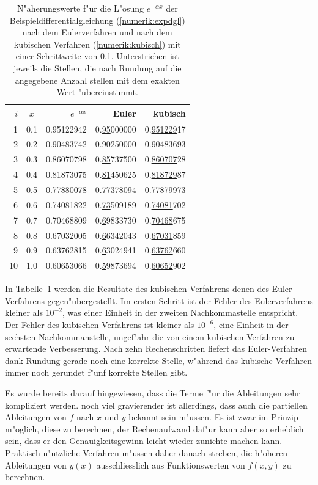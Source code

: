\begin{table}
\centering
\begin{tabular}{|r|c|r|r|r|}
\hline
$i$&$x$&$e^{-\alpha x}$&Euler&kubisch\\
\hline
 1 & 0.1 & 0.95122942 & 0.\underline{95}000000 & 0.\underline{951229}17 \\
 2 & 0.2 & 0.90483742 & 0.\underline{90}250000 & 0.\underline{904836}93 \\
 3 & 0.3 & 0.86070798 & 0.\underline{85}737500 & 0.\underline{860707}28 \\
 4 & 0.4 & 0.81873075 & 0.\underline{81}450625 & 0.\underline{818729}87 \\
 5 & 0.5 & 0.77880078 & 0.\underline{77}378094 & 0.\underline{778799}73 \\
 6 & 0.6 & 0.74081822 & 0.\underline{73}509189 & 0.\underline{74081}702 \\
 7 & 0.7 & 0.70468809 & 0.\underline{6}9833730 & 0.\underline{70468}675 \\
 8 & 0.8 & 0.67032005 & 0.\underline{6}6342043 & 0.\underline{67031}859 \\
 9 & 0.9 & 0.63762815 & 0.\underline{6}3024941 & 0.\underline{63762}660 \\
10 & 1.0 & 0.60653066 & 0.\underline{5}9873694 & 0.\underline{60652}902 \\
\hline
\end{tabular}
\caption{N"aherungswerte f"ur die L"osung $e^{-\alpha x}$ der
Beispieldifferentialgleichung (\ref{numerik:expdgl}) nach dem Eulerverfahren
und nach dem kubischen Verfahren (\ref{numerik:kubisch}) mit einer
Schrittweite von 0.1. Unterstrichen ist jeweils die Stellen, die nach
Rundung auf die angegebene Anzahl stellen mit dem exakten Wert "ubereinstimmt.
\label{numerik:euler-kubisch}}
\end{table}%
In Tabelle~\ref{numerik:euler-kubisch} werden die Resultate des
kubischen Verfahrens denen des Euler-Verfahrens gegen"ubergestellt.
Im ersten Schritt ist der Fehler des Eulerverfahrens kleiner als $10^{-2}$,
was einer Einheit in der zweiten Nachkommastelle entspricht.
Der Fehler des kubischen Verfahrens ist kleiner als $10^{-6}$, eine
Einheit in der sechsten Nachkommanstelle, ungef"ahr die von einem
kubischen Verfahren zu erwartende Verbesserung.
Nach zehn Rechenschritten liefert das Euler-Verfahren dank Rundung
gerade noch eine korrekte Stelle, w"ahrend das kubische Verfahren immer noch
gerundet f"unf korrekte Stellen gibt.

Es wurde bereits darauf hingewiesen, dass die Terme f"ur die Ableitungen
sehr kompliziert werden.
noch viel gravierender ist allerdings, dass auch die partiellen Ableitungen
von $f$ nach $x$ und $y$ bekannt sein m"ussen.
Es ist zwar im Prinzip m"oglich, diese zu berechnen, der Rechenaufwand 
daf"ur kann aber so erheblich sein, dass er den Genauigkeitsgewinn
leicht wieder zunichte machen kann.
Praktisch n"utzliche Verfahren m"ussen daher danach streben,
die h"oheren Ableitungen von $y(x)$ ausschliesslich aus Funktionswerten
von $f(x,y)$ zu berechnen.

